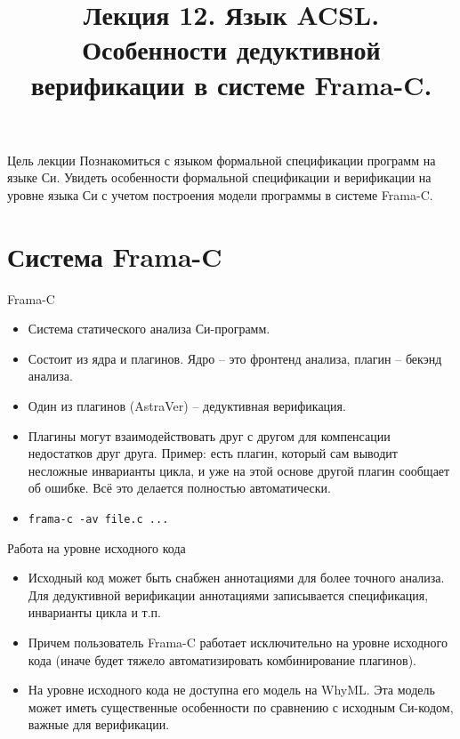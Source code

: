 \documentclass[hyperref={unicode=true}]{beamer}
\title{Лекция 12. Язык ACSL. Особенности
дедуктивной верификации в системе Frama-C.}
\author{}
\date{}
\begin{document}
	\begin{frame}{}
		\titlepage
	\end{frame}

    \begin{frame}{Цель лекции}
    Познакомиться с языком формальной спецификации
    программ на языке Си. Увидеть особенности
    формальной спецификации и верификации на уровне
    языка Си с учетом построения модели программы
    в системе Frama-C.
    \end{frame}

    \section{Система Frama-C}

    \begin{frame}{Frama-C}
    \begin{itemize}
    \item Система статического анализа Си-программ.
    \item Состоит из ядра и плагинов. Ядро -- это фронтенд
    анализа, плагин -- бекэнд анализа.
    \item Один из плагинов (AstraVer) -- дедуктивная верификация.
    \item Плагины могут взаимодействовать друг с другом
    для компенсации недостатков друг друга. Пример:
    есть плагин, который сам выводит несложные инварианты цикла,
    и уже на этой основе другой плагин сообщает об ошибке.
    Всё это делается полностью автоматически.
    \item \texttt{frama-c -av file.c ...}
    \end{itemize}
    \end{frame}

    \begin{frame}{Работа на уровне исходного кода}
    \begin{itemize}
    \item Исходный код может быть снабжен аннотациями
    для более точного анализа. Для дедуктивной верификации
    аннотациями записывается спецификация, инварианты цикла
    и т.п.
    \item Причем пользователь Frama-C работает
    исключительно на уровне исходного кода (иначе будет тяжело
    автоматизировать комбинирование плагинов).
    \item На уровне исходного кода не доступна его модель на WhyML.
    Эта модель может иметь существенные особенности по сравнению
    с исходным Си-кодом, важные для верификации.
    \end{itemize}
    \end{frame}
\end{document}
